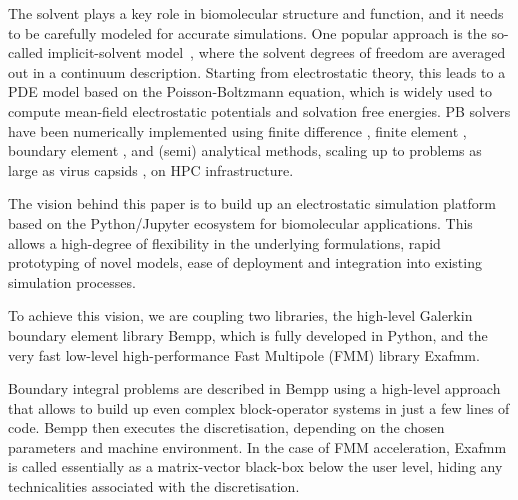 The solvent plays a key role in biomolecular structure and function, and it needs to be carefully modeled for accurate simulations. 
One popular approach is the so-called implicit-solvent model~\cite{RouxSimonson1999,DescherchiETal2015}, where the solvent degrees of freedom are averaged out in a continuum description.
Starting from electrostatic theory, this leads to a PDE model based on the Poisson-Boltzmann equation, which is widely used to compute mean-field electrostatic potentials and solvation free energies.
PB solvers have been numerically implemented using finite difference \cite{delphi, apbs}, finite element \cite{apbs}, boundary element \cite{afmpb, tabi, pygbe}, and (semi) analytical \cite{thg} methods, scaling up to problems as large as virus capsids \cite{lu,MartinezETal2019}, on HPC infrastructure.

The vision behind this paper is to build up an electrostatic simulation platform based on the Python/Jupyter ecosystem for biomolecular applications. This allows a high-degree of flexibility in the underlying formulations, rapid prototyping of novel models, ease of deployment and integration into existing simulation processes.

To achieve this vision, we are coupling two libraries, the high-level Galerkin boundary element library Bempp, which is fully developed in Python, and the very fast low-level high-performance Fast Multipole (FMM) library Exafmm. 

Boundary integral problems are described in Bempp using a high-level approach that allows to build up even complex block-operator systems in just a few lines of code. Bempp then executes the discretisation, depending on the chosen parameters and machine environment. In the case of FMM acceleration, Exafmm is called essentially as a matrix-vector black-box below the user level, hiding any technicalities associated with the discretisation.

